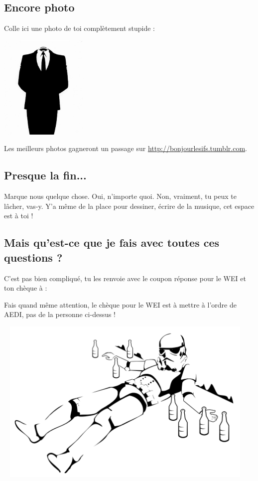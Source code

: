 \subsection*{Encore photo}
Colle ici une photo de toi complètement stupide :
\begin{center}
\includegraphics[height=5cm, angle=120]{images/anonymous.jpg}
\end{center}

Les meilleurs photos gagneront un passage sur
\url{http://bonjourlesifs.tumblr.com}.

\subsection*{Presque la fin...}
Marque nous quelque chose. Oui, n'importe quoi. Non, vraiment, tu peux te
lâcher, vas-y. Y'a même de la place pour dessiner, écrire de la musique, cet
espace est à toi !
\vspace{8cm}
\subsection{Mais qu'est-ce que je fais avec toutes ces questions ?}
C'est pas bien compliqué, tu les renvoie avec le coupon réponse pour le WEI et
ton chèque à :
\adresseCoupon



Fais quand même attention, le chèque pour le WEI est à mettre à l'ordre de AEDI, pas de la personne ci-dessus !

\vfill
\columnbreak
~
\vfill
\hspace{-5cm}
\includegraphics[height=8cm]{images/stormTrooperBourre.png}
